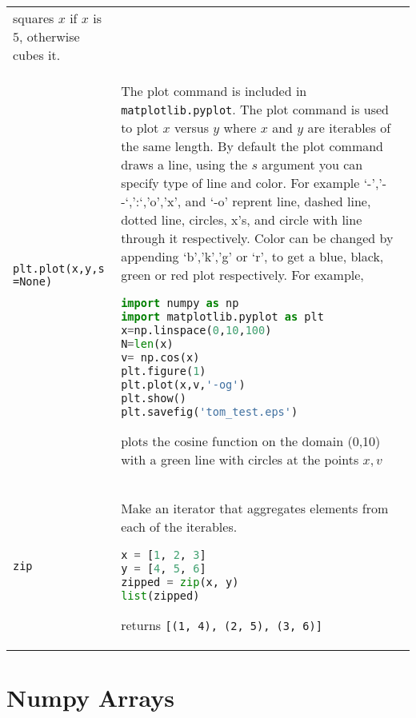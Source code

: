 \begin{tabular}[]{@{}ll@{}}
\begin{minipage}[t]{0.77\columnwidth}
squares \(x\) if \(x\) is \(5\), otherwise cubes it.\strut
\end{minipage}\tabularnewline
\begin{minipage}[t]{0.17\columnwidth}\raggedright\strut
\lstinline!plt.plot(x,y,s =None)!\strut
\end{minipage} & \begin{minipage}[t]{0.77\columnwidth}\raggedright\strut
The plot command is included in \lstinline!matplotlib.pyplot!. The plot
command is used to plot \(x\) versus \(y\) where \(x\) and \(y\) are
iterables of the same length. By default the plot command draws a line,
using the \(s\) argument you can specify type of line and color. For
example `-','- -`,':`,'o','x', and `-o' reprent line, dashed line,
dotted line, circles, x's, and circle with line through it respectively.
Color can be changed by appending `b','k','g' or `r', to get a blue,
black, green or red plot respectively. For example,

\begin{lstlisting}[language=Python]
import numpy as np
import matplotlib.pyplot as plt
x=np.linspace(0,10,100)
N=len(x)
v= np.cos(x)
plt.figure(1)
plt.plot(x,v,'-og')
plt.show()
plt.savefig('tom_test.eps')
\end{lstlisting}

plots the cosine function on the domain (0,10) with a green line with
circles at the points \(x,v\)\strut
\end{minipage}\tabularnewline
\begin{minipage}[t]{0.17\columnwidth}\raggedright\strut
\lstinline!zip!\strut
\end{minipage} & \begin{minipage}[t]{0.77\columnwidth}\raggedright\strut
Make an iterator that aggregates elements from each of the iterables.

\begin{lstlisting}[language=Python]
x = [1, 2, 3]
y = [4, 5, 6]
zipped = zip(x, y)
list(zipped)
\end{lstlisting}

returns \lstinline![(1, 4), (2, 5), (3, 6)]!\strut
\end{minipage}\tabularnewline
\bottomrule
\end{tabular}

\section{Numpy Arrays}\label{numpy-arrays}

